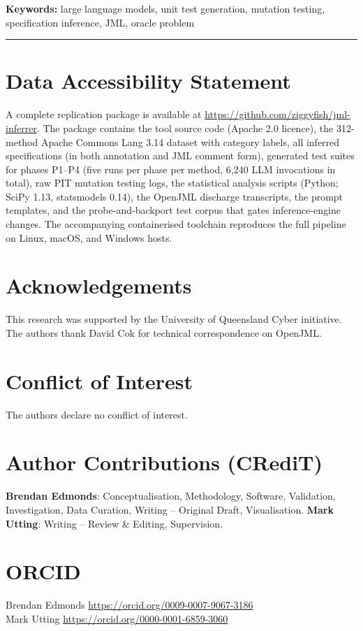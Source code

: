 \documentclass[11pt]{article}
\begin{document}
\noindent\textbf{Keywords:} large language models, unit test generation, mutation testing, specification inference, JML, oracle problem

\vspace{1em}
\hrule
\vspace{1em}











\section*{Data Accessibility Statement}

A complete replication package is available at \url{https://github.com/ziggyfish/jml-inferrer}. The package contains the tool source code (Apache 2.0 licence), the 312-method Apache Commons Lang 3.14 dataset with category labels, all inferred specifications (in both annotation and JML comment form), generated test suites for phases P1--P4 (five runs per phase per method, 6{,}240 LLM invocations in total), raw PIT mutation testing logs, the statistical analysis scripts (Python; SciPy 1.13, statsmodels 0.14), the OpenJML discharge transcripts, the prompt templates, and the probe-and-backport test corpus that gates inference-engine changes. The accompanying containerised toolchain reproduces the full pipeline on Linux, macOS, and Windows hosts.

\section*{Acknowledgements}

This research was supported by the University of Queensland Cyber initiative. The authors thank David Cok for technical correspondence on OpenJML.

\section*{Conflict of Interest}

The authors declare no conflict of interest.

\section*{Author Contributions (CRediT)}

\textbf{Brendan Edmonds}: Conceptualisation, Methodology, Software, Validation, Investigation, Data Curation, Writing -- Original Draft, Visualisation. \textbf{Mark Utting}: Writing -- Review \& Editing, Supervision.

\section*{ORCID}

Brendan Edmonds \url{https://orcid.org/0009-0007-9067-3186}\\
Mark Utting \url{https://orcid.org/0000-0001-6859-3060}



\end{document}
